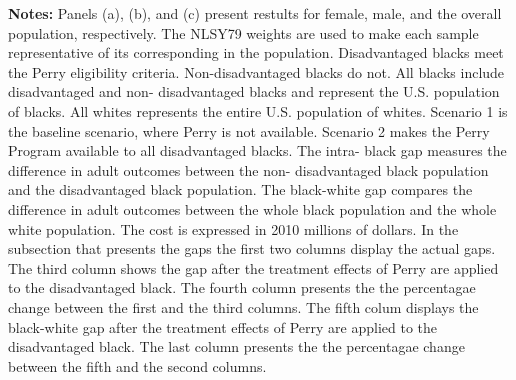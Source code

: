 \begin{table}[htbp]
{{{\bfseries Notes:} Panels (a), (b), and (c) present restults for female, male, and the overall population, respectively. The NLSY79 weights are used to make each sample representative of its corresponding in the population. Disadvantaged blacks meet the  Perry eligibility criteria. Non-disadvantaged blacks do  not. All blacks include disadvantaged and non- disadvantaged blacks and represent the U.S. population of blacks. All  whites represents the entire U.S. population of whites.  Scenario 1 is the baseline scenario, where Perry is not available. Scenario 2  makes the Perry Program available to all disadvantaged blacks. The intra- black gap measures the difference in adult outcomes between the non- disadvantaged black population and the disadvantaged black population.  The black-white gap compares the difference in adult outcomes between the  whole black population and the whole white population. The cost is expressed in 2010 millions of dollars. In the subsection that presents the gaps the first two columns display the actual gaps. The third column shows the gap after the treatment effects of Perry are applied to the disadvantaged black. The fourth column presents the the percentagae change between the first and the third columns. The fifth colum displays the black-white gap after the treatment effects of Perry are applied to the disadvantaged black.  The last column presents the the percentagae change between the fifth and the second columns.} } 
 \end{table}
